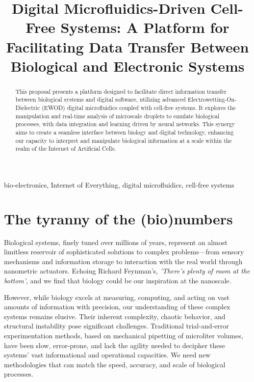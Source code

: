 \documentclass[conference]{IEEEtran}
\begin{document}
\title{Digital Microfluidics-Driven Cell-Free Systems: A Platform for Facilitating Data Transfer Between Biological and Electronic Systems}

\author{
}

\maketitle

\begin{abstract}
    This proposal presents a platform designed to facilitate direct information transfer between biological systems and digital software, utilizing advanced Electrowetting-On-Dielectric (EWOD) digital microfluidics coupled with cell-free systems. It explores the manipulation and real-time analysis of microscale droplets to emulate biological processes, with data integration and learning driven by neural networks. This synergy aims to create a seamless interface between biology and digital technology, enhancing our capacity to interpret and manipulate biological information at a scale within the realm of the Internet of Artificial Cells.
    \end{abstract}
    
    \begin{IEEEkeywords}
    bio-electronics, Internet of Everything, digital microfluidics, cell-free systems
    \end{IEEEkeywords}

\section{The tyranny of the (bio)numbers}

Biological systems, finely tuned over millions of years, represent an almost limitless reservoir of sophisticated solutions to complex problems—from sensory mechanisms and information storage to interaction with the real world through nanometric actuators. Echoing Richard Feynman's, \textit{'There's plenty of room at the bottom'}, and we find that biology could be our inspiration at the nanoscale. 

However, while biology excels at measuring, computing, and acting on vast amounts of information with precision, our understanding of these complex systems remains elusive. Their inherent complexity, chaotic behavior, and structural instability pose significant challenges. Traditional trial-and-error experimentation methods, based on mechanical pipetting of microliter volumes, have been slow, error-prone, and lack the agility needed to decipher these systems' vast informational and operational capacities. We need new methodologies that can match the speed, accuracy, and scale of biological processes.
\end{document}
